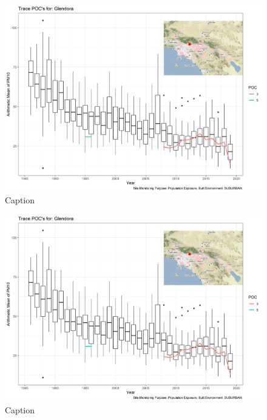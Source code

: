 \begin{figure}
    \centering
    \includegraphics[width = \textwidth]{Figures/IndividualSiteTraces/TracePOC_Glendora.png}
    \caption{Caption}
    \label{fig:my_label}
\end{figure}

\begin{figure}
    \centering
    \includegraphics[width = \textwidth]{Figures/IndividualSiteTraces/TracePOC_Glendora.png}
    \caption{Caption}
    \label{fig:my_label}
\end{figure}

